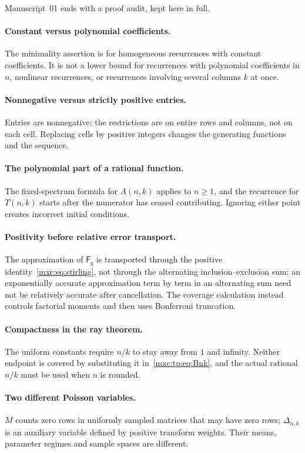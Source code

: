 \documentclass[11pt]{article}
\numberwithin{equation}{section}
\theoremstyle{definition}
\theoremstyle{remark}
\begin{document}
Manuscript~01 ends with a proof audit, kept here in full.

\paragraph{Constant versus polynomial coefficients.} The minimality
assertion is for homogeneous recurrences with constant coefficients. It is
not a lower bound for recurrences with polynomial coefficients in $n$,
nonlinear recurrences, or recurrences involving several columns $k$ at
once.

\paragraph{Nonnegative versus strictly positive entries.} Entries are
nonnegative; the restrictions are on entire rows and columns, not on each
cell. Replacing cells by positive integers changes the generating
functions and the sequence.

\paragraph{The polynomial part of a rational function.} The
fixed-spectrum formula for $A(n,k)$ applies to $n\ge1$, and the
recurrence for $T(n,k)$ starts after the numerator has ceased
contributing. Ignoring either point creates incorrect initial conditions.

\paragraph{Positivity before relative error transport.} The approximation
of $\mathsf F_q$ is transported through the positive
identity~\eqref{mxc:eq:stirling}, not through the alternating
inclusion--exclusion sum: an exponentially accurate approximation term by
term in an alternating sum need not be relatively accurate after
cancellation. The coverage calculation instead controls factorial moments
and then uses Bonferroni truncation.

\paragraph{Compactness in the ray theorem.} The uniform constants require
$n/k$ to stay away from $1$ and infinity. Neither endpoint is covered by
substituting it in~\eqref{mxc:tp:eq:Bnk}, and the actual rational $n/k$
must be used when $n$ is rounded.

\paragraph{Two different Poisson variables.} $M$ counts zero rows in
uniformly sampled matrices that may have zero rows; $\Delta_{n,k}$ is an
auxiliary variable defined by positive transform weights. Their means,
parameter regimes and sample spaces are different.
\end{document}
